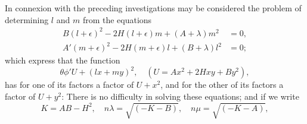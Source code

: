 \documentclass[11pt,a4paper]{article}
\theoremstyle{definition}
\begin{document}
In connexion with the preceding investigations may be considered the problem of determining $l$ and $m$ from the equations
\begin{align*}
B(l + \epsilon)^{2} - 2H(l + \epsilon)m + (A + \lambda)m^{2} &= 0, \\
A'(m + \epsilon)^{2} - 2H(m + \epsilon)l + (B + \lambda)l^{2} &= 0;
\end{align*}
which express that the function
\[
\theta\phi' U + (lx + my)^{2}, \quad (U = Ax^{2} + 2Hxy + By^{2}),
\]
has for one of its factors a factor of $U + x^{2}$, and for the other of its factors a factor of $U + y^{2}$: There is no difficulty in solving these equations; and if we write
\[
K = AB - H^{2}, \quad n\lambda = \sqrt{(-K - B)}, \quad n\mu = \sqrt{(-K - A)},
\]
\end{document}
